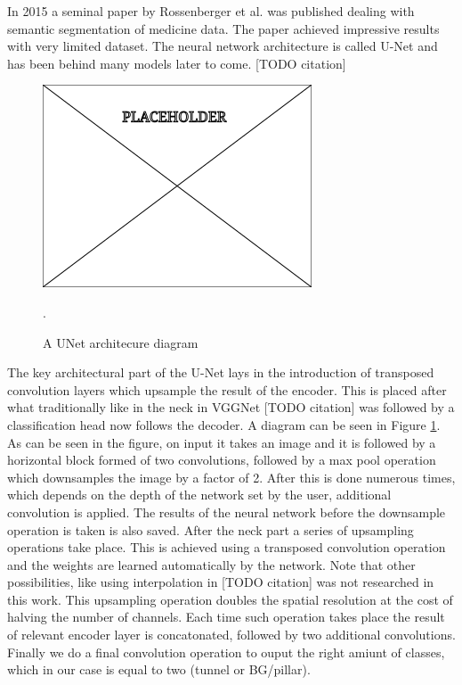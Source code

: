 \documentclass[
  digital,     %
  oneside,     %
  nosansbold,  %
  nocolorbold, %
  lof,         %
  lot,         %
]{fithesis4}
\begin{document}
In 2015 a seminal paper by Rossenberger et al. \parencite{Ronneberger2015} was
published dealing with semantic segmentation of medicine data. The paper
achieved impressive results with very limited dataset. The neural network
architecture is called U-Net and has been behind many models later to come.
[TODO citation]

\begin{figure}
    \begin{center}
        \includegraphics[width=0.6\linewidth]{resources/placeholder.png}
    \end{center}
    \caption{A UNet architecure diagram}.
    \label{fig:unetdiagram}
\end{figure}

The key architectural part of the U-Net lays in the introduction of transposed
convolution layers which upsample the result of the encoder. This is placed
after what traditionally like in the neck in VGGNet [TODO citation] was followed
by a classification head now follows the decoder. A diagram can be seen in
Figure \ref{fig:unetdiagram}. As can be seen in the figure, on input it takes an
image and it is followed by a horizontal block formed of two convolutions,
followed by a max pool operation which downsamples the image by a factor of 2.
After this is done numerous times, which depends on the depth of the network set
by the user, additional convolution is applied. The results of the neural
network before the downsample operation is taken is also saved. After the neck
part a series of upsampling operations take place. This is achieved using a
transposed convolution operation and the weights are learned automatically by
the network. Note that other possibilities, like using interpolation in [TODO
citation] was not researched in this work. This upsampling operation doubles the
spatial resolution at the cost of halving the number of channels. Each time such
operation takes place the result of relevant encoder layer is concatonated,
followed by two additional convolutions. Finally we do a final convolution
operation to ouput the right amiunt of classes, which in our case is equal to
two (tunnel or BG/pillar).
\end{document}
